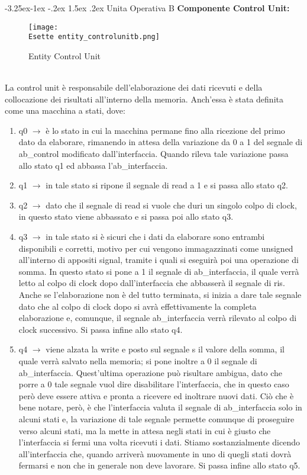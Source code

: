 \documentclass[12pt]{article}
\makeatletter
\renewcommand\subsubsection{\@startsection{subsubsection}{3}{\z@}%
            {-3.25ex\@plus -1ex \@minus -.2ex}%
            {1.5ex \@plus .2ex}%
            {\normalfont\large\bfseries}}
\def \Esette {Allegati/Esercizio7/}
\makeatother
\begin{document}
\subsubsection{Unita Operativa B}
{\large \textbf{Componente Control Unit:}}
\begin{figure}[ht!]
    \centering
    \texttt{[image: \\Esette entity\_controlunitb.png]}
    \caption{Entity Control Unit}
\end{figure}
\\La control unit è responsabile dell’elaborazione dei dati ricevuti e della collocazione dei risultati all’interno della memoria. Anch’essa è stata definita come una macchina a stati, dove:
\begin{enumerate}
    \item q0 $\rightarrow$ è lo stato in cui la macchina permane fino alla ricezione del primo dato da elaborare, rimanendo in attesa della variazione da 0 a 1 del segnale di ab\_control modificato dall’interfaccia.
          Quando rileva tale variazione passa allo stato q1 ed abbassa l’ab\_interfaccia.
    \item q1 $\rightarrow$ in tale stato si ripone il segnale di read a 1  e si passa allo stato q2.
    \item q2 $\rightarrow$ dato che il segnale di read si vuole che duri un singolo colpo di clock, in questo stato viene abbassato e si passa poi allo stato q3.
    \item q3 $\rightarrow$ in tale stato si è sicuri che i dati da elaborare sono entrambi disponibili e corretti, motivo per cui vengono immagazzinati come unsigned all’interno di appositi signal, tramite i quali si eseguirà poi una operazione di somma. In questo stato si pone a 1 il segnale di ab\_interfaccia, il quale verrà letto al colpo di clock dopo dall’interfaccia che abbasserà il segnale di ris. Anche se l’elaborazione non è del tutto terminata, si inizia a dare tale segnale dato che al colpo di clock dopo si avrà effettivamente la completa elaborazione e, comunque, il segnale ab\_interfaccia verrà rilevato al colpo di clock successivo. Si passa infine allo stato q4.
    \item q4 $\rightarrow$ viene alzata la write e posto sul segnale s il valore della somma, il quale verrà salvato nella memoria; si pone inoltre a 0 il segnale di ab\_interfaccia. Quest’ultima operazione può risultare ambigua, dato che porre a 0 tale segnale vuol dire disabilitare l’interfaccia, che in questo caso però deve essere attiva e pronta a ricevere ed inoltrare nuovi dati. Ciò che è bene notare, però, è che l’interfaccia valuta il segnale di ab\_interfaccia solo in alcuni stati e, la variazione di tale segnale permette comunque di proseguire verso alcuni stati, ma la mette in attesa negli stati in cui è giusto che l’interfaccia si fermi una volta ricevuti i dati. Stiamo sostanzialmente dicendo all’interfaccia che, quando arriverà nuovamente in uno di quegli stati dovrà fermarsi e non che in generale non deve lavorare. Si passa infine allo stato q5.

\end{enumerate}
\end{document}
